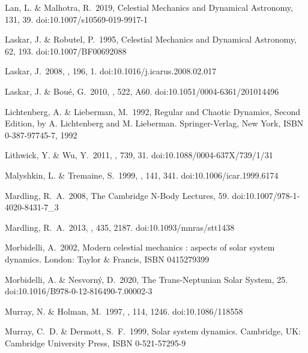 \documentclass[twocolumn]{aastex62}
\begin{document}
\begin{thebibliography}{00}

 Lan, L. \& Malhotra, R.\ 2019, Celestial Mechanics and Dynamical Astronomy, 131, 39. doi:10.1007/s10569-019-9917-1

 Laskar, J. \& Robutel, P.\ 1995, Celestial Mechanics and Dynamical Astronomy, 62, 193. doi:10.1007/BF00692088

 Laskar, J.\ 2008, \icarus, 196, 1. doi:10.1016/j.icarus.2008.02.017

 Laskar, J. \& Bou{\'e}, G.\ 2010, \aap, 522, A60. doi:10.1051/0004-6361/201014496

 Lichtenberg, A. \& Lieberman, M.\ 1992, Regular and Chaotic Dynamics, Second Edition, by A. Lichtenberg and M. Lieberman. Springer-Verlag, New York, ISBN 0-387-97745-7, 1992

 Lithwick, Y. \& Wu, Y.\ 2011, \apj, 739, 31. doi:10.1088/0004-637X/739/1/31




 Malyshkin, L. \& Tremaine, S.\ 1999, \icarus, 141, 341. doi:10.1006/icar.1999.6174


 Mardling, R.~A.\ 2008, The Cambridge N-Body Lectures, 59. doi:10.1007/978-1-4020-8431-7\_3

 Mardling, R.~A.\ 2013, \mnras, 435, 2187. doi:10.1093/mnras/stt1438

 Morbidelli, A.\ 2002, Modern celestial mechanics : aspects of solar system dynamics. London: Taylor \& Francis, ISBN 0415279399


 Morbidelli, A. \& Nesvorn{\'y}, D.\ 2020, The Trans-Neptunian Solar System, 25. doi:10.1016/B978-0-12-816490-7.00002-3

 Murray, N. \& Holman, M.\ 1997, \aj, 114, 1246. doi:10.1086/118558

 Murray, C.~D. \& Dermott, S.~F.\ 1999, Solar system dynamics. Cambridge, UK: Cambridge University Press, ISBN 0-521-57295-9


\end{thebibliography}
\end{document}
